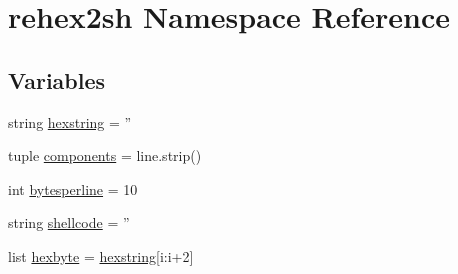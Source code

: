 \hypertarget{namespacerehex2sh}{
\section{rehex2sh \-Namespace \-Reference}
\label{namespacerehex2sh}
}
\subsection*{\-Variables}
\begin{DoxyCompactItemize}
\item 
string \hyperlink{namespacerehex2sh_ae94339789f7c777c35511b0d5e15f985}{hexstring} = ''
\item 
tuple \hyperlink{namespacerehex2sh_a46d30aa0b79379b0ae46b60e57e3a36b}{components} = line.\-strip()
\item 
int \hyperlink{namespacerehex2sh_a6871a6d428039f71f95e8fafadae894e}{bytesperline} = 10
\item 
string \hyperlink{namespacerehex2sh_adc89af6fa1de3747a0439ec88e8e947f}{shellcode} = ''
\item 
list \hyperlink{namespacerehex2sh_aac23a21b6bd08055ad23d4b30b34367b}{hexbyte} = \hyperlink{namespacerehex2sh_ae94339789f7c777c35511b0d5e15f985}{hexstring}\mbox{[}i\-:i+2\mbox{]}
\end{DoxyCompactItemize}



